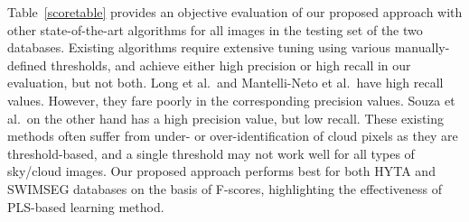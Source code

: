 Table~\ref{scoretable} provides an objective evaluation of our proposed approach with other state-of-the-art algorithms for all images in the testing set of the two databases.  Existing algorithms require extensive tuning using various manually-defined thresholds, and achieve either high precision or high recall in our evaluation, but not both. Long et al.\ and Mantelli-Neto et al.\ have high recall values. However, they fare poorly in the corresponding precision values. Souza et al.\ on the other hand has a high precision value, but low recall. These existing methods often suffer from under- or over-identification of cloud pixels as they are threshold-based, and a single threshold may not work well for all types of sky/cloud images. Our proposed approach performs best for both HYTA and SWIMSEG databases on the basis of F-scores, highlighting the effectiveness of PLS-based learning method. 

